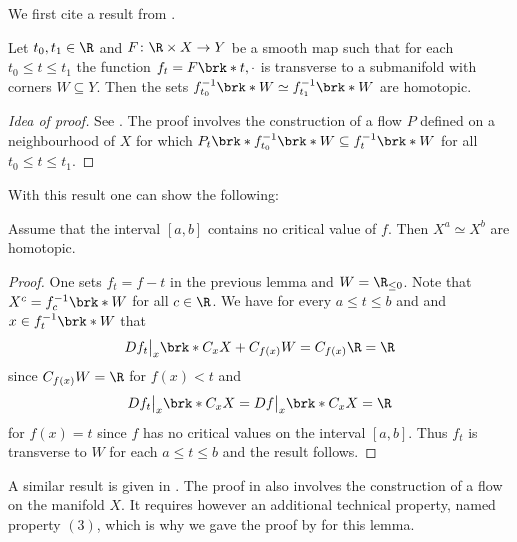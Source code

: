 We first cite a result from \cite{Agrach1991}.
\begin{proposition}
  \label{pr:Morse_TransversalityLemma}
  Let $t_0,t_1\in\R$ and $F\colon \R\times X\to Y$ be a smooth map such that for each $t_0\leq t\leq t_1$ the function
  $f_t=F\brk*{t,\cdot}$ is transverse to a submanifold with corners $W\subseteq Y$.
  Then the sets $f_{t_0}^{-1}\brk*{W}\simeq f_{t_1}^{-1}\brk*{W}$
  are homotopic.
\end{proposition}
\begin{proof}[Idea of proof]
  See \cite[Theorem 2.1]{Agrach1991}.
  The proof involves the construction of a flow $P$ defined on a neighbourhood of $X$
  for which $P_t\brk*{f_{t_0}^{-1}\brk*{W}}\subseteq f_{t}^{-1}\brk*{W}$ for all $t_0\leq t\leq t_1$.
\end{proof}
With this result one can show the following:
\begin{lemma}
  \label{le:Morse_homotopicNoCP}
  Assume that the interval $[a,b]$ contains no critical value of $f$.
  Then $X^a\simeq X^b$ are homotopic.
\end{lemma}
\begin{proof}
  One sets $f_t=f-t$ in the previous lemma and $W=\R_{\leq0}$.
  Note that $X^c=f_c^{-1}\brk*{W}$ for all $c\in\R$.
  We have for every
  $a\leq t\leq b$ and and $x\in f_t^{-1}\brk*{W}$ that
  \begin{align*}
    Df_t\big\vert_{x}\brk*{C_{x}X}+C_{f(x)}W=C_{f(x)}\R=\R
  \end{align*}
  since $C_{f(x)}W=\R$ for $f(x)<t$ and $$Df_t\big\vert_{x}\brk*{C_xX}=Df\big\vert_{x}\brk*{C_xX}=\R$$
  for $f(x)=t$
  since $f$ has no critical values on the interval $[a,b]$.
  Thus $f_t$ is transverse to $W$ for each $a\leq t\leq b$ and the result follows.
\end{proof}
A similar result is given in \cite[Theorem 7]{Handron2002}.
The proof in \cite[Theorem 7]{Handron2002} also involves the construction of a flow
on the manifold $X$. It requires however an additional technical property, named
property $(3)$, which is why we gave the proof by \cite{Agrach1991} for this lemma.



